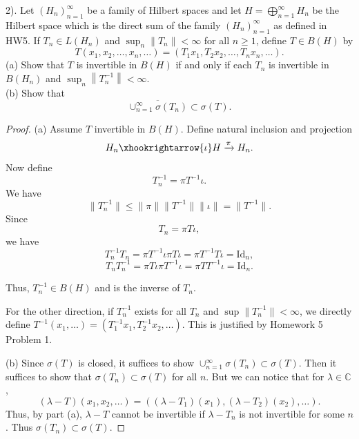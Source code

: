 \begin{problem}
	2). Let $\left(H_n\right)_{n=1}^{\infty}$ be a family of Hilbert spaces and let $H=\bigoplus_{n=1}^{\infty} H_n$ be the Hilbert space which is the direct sum of the family $\left(H_n\right)_{n=1}^{\infty}$ as defined in HW5. If $T_n \in L\left(H_n\right)$ and $\sup _n\left\|T_n\right\|<\infty$ for all $n \geq 1$, define $T \in B(H)$ by
\[
T\left(x_1, x_2, \ldots, x_n, \ldots\right)=\left(T_1 x_1, T_2 x_2, \ldots, T_n x_n, \ldots\right) .
\]
(a) Show that $T$ is invertible in $B(H)$ if and only if each $T_n$ is invertible in $B\left(H_n\right)$ and $\sup _n\left\|T_n^{-1}\right\|<\infty$.\\
(b) Show that
\[
\overline{\cup_{n=1}^{\infty} \sigma\left(T_n\right)} \subset \sigma(T) .
\]
\end{problem}
\begin{proof}
	(a) Assume $T$ invertible in $B(H)$. Define natural inclusion and projection
	\[
		H_n \xhookrightarrow{\iota} H \xrightarrow{\pi} H_n
	.\] 
	Now define
	\[
		T_n^{-1} = \pi T^{-1} \iota
	.\] 
	We have
	\[
		\|T_n^{-1}\| \le \|\pi\| \|T^{-1}\| \|\iota\| = \|T^{-1}\|
	.\] 
	Since
	 \[
		T_n = \pi T \iota
	,\] 
	we have
	\[
		T_n^{-1} T_n = \pi T^{-1} \iota \pi T \iota = \pi T^{-1} T \iota = \text{Id}_n
	,\] 
	\[
		T_n T_n^{-1} = \pi T \iota \pi T^{-1} \iota = \pi T T^{-1} \iota = \text{Id}_n
	.\] 

	Thus, $T_n^{-1} \in B(H)$ and is the inverse of $T_n$.

	For the other direction, if $T_n^{-1}$ exists for all $T_n$ and $\sup  \|T_n^{-1}\| < \infty $, we directly define $T^{-1}(x_1, \ldots) = (T_1^{-1}x_1, T_2^{-1}x_2, \ldots)$. This is justified by Homework 5 Problem 1.

	(b) Since $\sigma(T)$ is closed, it suffices to show $\cup_{n = 1}^\infty  \sigma(T_n) \subset \sigma(T)$. Then it suffices to show that $\sigma(T_n) \subset \sigma(T)$ for all $n$. But we can notice that for $\lambda \in \mathbb{C}$,
	\[
		(\lambda - T) (x_1, x_2, \ldots)
		= \left( (\lambda - T_1)(x_1), (\lambda - T_2)(x_2), \ldots \right) 
	.\] 
	Thus, by part (a), $\lambda - T$ cannot be invertible if $\lambda - T_n$ is not invertible for some $n$. Thus $\sigma(T_n) \subset \sigma(T)$.
\end{proof}

\newpage

